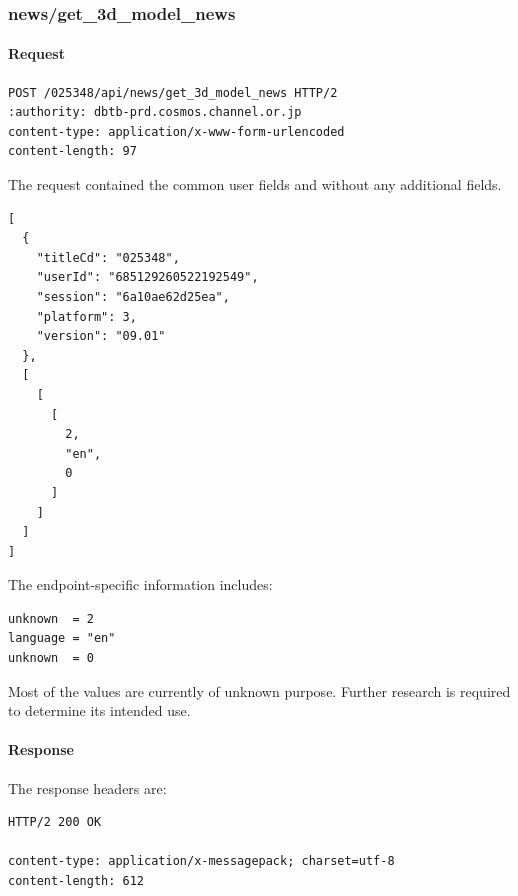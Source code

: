 \subsubsection{news/get\_3d\_model\_news}
\label{subsec:api_news_get_3d_model_news}

\paragraph{Request}

\begin{lstlisting}
POST /025348/api/news/get_3d_model_news HTTP/2
:authority: dbtb-prd.cosmos.channel.or.jp
content-type: application/x-www-form-urlencoded
content-length: 97
\end{lstlisting}

The request contained the common user fields and without any additional fields.

\begin{lstlisting}
[
  {
    "titleCd": "025348",
    "userId": "685129260522192549",
    "session": "6a10ae62d25ea",
    "platform": 3,
    "version": "09.01"
  },
  [
    [
      [
        2,
        "en",
        0
      ]
    ]
  ]
]
\end{lstlisting}

The endpoint-specific information includes:

\begin{lstlisting}
unknown  = 2
language = "en"
unknown  = 0
\end{lstlisting}

\begin{tcolorbox}[colback=yellow!10,colframe=orange!80!black,title=Warning]
Most of the values are currently of unknown purpose.
Further research is required to determine its intended use.
\end{tcolorbox}

\newpage

\paragraph{Response}

The response headers are:

\begin{lstlisting}
HTTP/2 200 OK

content-type: application/x-messagepack; charset=utf-8
content-length: 612
\end{lstlisting}


